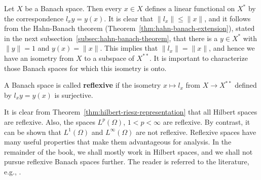 \begin{Example}
\label{ex:canonical-bidual-isometry}
Let $X$ be a Banach space. Then every $x\in X$ defines a linear functional on $X^*$ by the correspondence $l_xy=y(x)$. It is clear that $\|l_x\|\leq\|x\|$, and it follows from the Hahn-Banach theorem (Theorem~\ref{thm:hahn-banach-extension}), stated in the next subsection~\ref{subsec:hahn-banach-theorem}, that there is a $y\in X^*$ with $\|y\|=1$ and $y(x)=\|x\|$. This implies that $\|l_x\|=\|x\|$, and hence we have an isometry from $X$ to a subspace of $X^{**}$. It is important to characterize those Banach spaces for which this isometry is onto.
\end{Example}

\begin{Definition}
\label{def:reflexive-banach-space}
A Banach space is called \textbf{reflexive} if the isometry $x\mapsto l_x$ from $X\to X^{**}$ defined by $l_xy=y(x)$ is surjective.
\end{Definition}

It is clear from Theorem~\ref{thm:hilbert-riesz-representation} that all Hilbert spaces are reflexive. Also, the spaces $L^p(\Omega)$, $1<p<\infty$ are reflexive. By contrast, it can be shown that $L^1(\Omega)$ and $L^\infty(\Omega)$ are not reflexive. Reflexive spaces have many useful properties that make them advantageous for analysis. In the remainder of the book, we shall mostly work in Hilbert spaces, and we shall not pursue reflexive Banach spaces further. The reader is referred to the literature, e.g., \cite{DS}.
